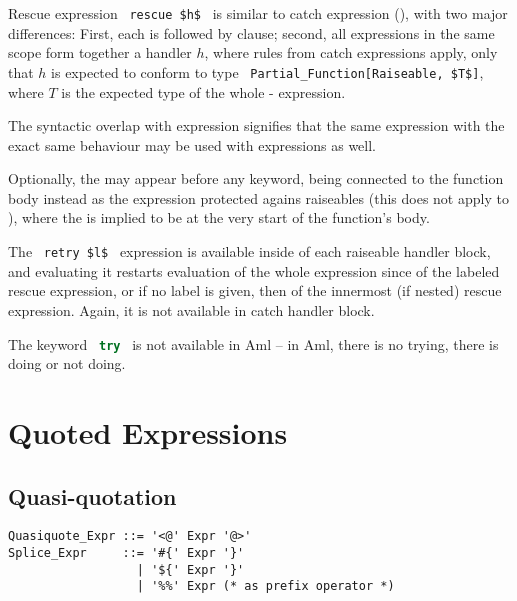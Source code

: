 Rescue expression ~\lstinline!rescue $h$!~ is similar to catch expression (), with two major differences: First, each  is followed by  clause; second, all  expressions in the same scope form together a handler $h$, where rules from catch expressions apply, only that $h$ is expected to conform to type ~\lstinline!Partial_Function[Raiseable, $T$]!, where $T$ is the expected type of the whole - expression. 

The syntactic overlap with  expression signifies that the same expression with the exact same behaviour may be used with  expressions as well. 

Optionally, the  may appear before any  keyword, being connected to the function body instead as the expression protected agains raiseables (this does not apply to ), where the  is implied to be at the very start of the function's body. 

The ~\lstinline!retry $l$!~ expression is available inside of each raiseable handler block, and evaluating it restarts evaluation of the whole expression since  of the labeled rescue expression, or if no label is given, then of the innermost (if nested) rescue expression. Again, it is not available in catch handler block. 

The keyword ~\lstinline[language=Java]!try!~ is not available in Aml -- in Aml, there is no trying, there is doing or not doing.  






\section{Quoted Expressions}
\label{sec:syntactic-forms}






\subsection{Quasi-quotation}
\label{sec:quasi-quotation}

\grammar\begin{lstlisting}[mathescape=false]
Quasiquote_Expr ::= '<@' Expr '@>'
Splice_Expr     ::= '#{' Expr '}'
                  | '${' Expr '}'
                  | '%%' Expr (* as prefix operator *)
\end{lstlisting}

